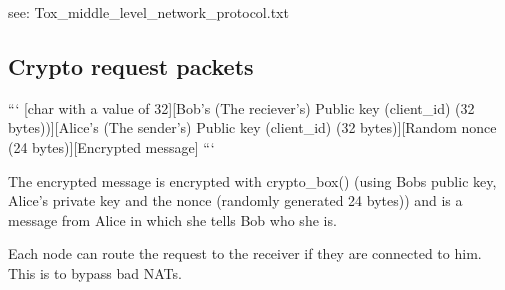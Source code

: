 see\+: Tox\+\_\+middle\+\_\+level\+\_\+network\+\_\+protocol.\+txt

\subsection*{Crypto request packets }

``` \mbox{[}char with a value of 32\mbox{]}\mbox{[}Bob's (The reciever's) Public key (client\+\_\+id) (32 bytes))\mbox{]}\mbox{[}Alice's (The sender's) Public key (client\+\_\+id) (32 bytes)\mbox{]}\mbox{[}Random nonce (24 bytes)\mbox{]}\mbox{[}Encrypted message\mbox{]} ```

The encrypted message is encrypted with crypto\+\_\+box() (using Bobs public key, Alice's private key and the nonce (randomly generated 24 bytes)) and is a message from Alice in which she tells Bob who she is.

Each node can route the request to the receiver if they are connected to him. This is to bypass bad N\+A\+Ts. 